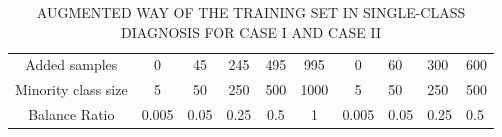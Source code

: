 \begin{table}[htbp]
\centering
\caption{AUGMENTED WAY OF THE TRAINING SET IN SINGLE-CLASS DIAGNOSIS FOR CASE I AND CASE II}
\label{tab:single_class_aug}
\begin{tabular}{ccccccc}
\toprule
Added samples & 0 & 45 & 245 & 495 & 995 & 0 & 60 & 300 & 600 \\
Minority class size & 5 & 50 & 250 & 500 & 1000 & 5 & 50 & 250 & 500 \\
Balance Ratio & 0.005 & 0.05 & 0.25 & 0.5 & 1 & 0.005 & 0.05 & 0.25 & 0.5 \\
\midrule
\end{tabular}
\end{table}
